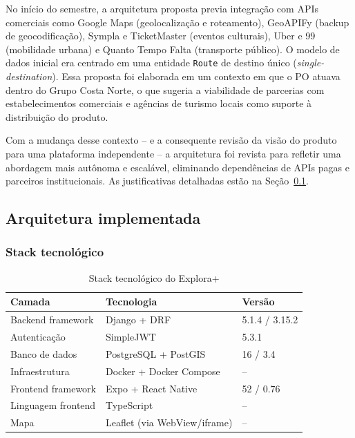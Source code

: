 \documentclass[12pt, a4paper]{article}
\begin{document}
No in\'icio do semestre, a arquitetura proposta previa integra\c{c}\~ao com APIs comerciais como Google Maps (geolocaliza\c{c}\~ao e roteamento), GeoAPIFy (backup de geocodifica\c{c}\~ao), Sympla e TicketMaster (eventos culturais), Uber e 99 (mobilidade urbana) e Quanto Tempo Falta (transporte p\'ublico). O modelo de dados inicial era centrado em uma entidade \texttt{Route} de destino \'unico (\emph{single-destination}). Essa proposta foi elaborada em um contexto em que o PO atuava dentro do Grupo Costa Norte, o que sugeria a viabilidade de parcerias com estabelecimentos comerciais e ag\^encias de turismo locais como suporte \`a distribui\c{c}\~ao do produto.

Com a mudan\c{c}a desse contexto -- e a consequente revis\~ao da vis\~ao do produto para uma plataforma independente -- a arquitetura foi revista para refletir uma abordagem mais aut\^onoma e escal\'avel, eliminando depend\^encias de APIs pagas e parceiros institucionais. As justificativas detalhadas est\~ao na Se\c{c}\~ao~\ref{sec:arch}.

\subsection{Arquitetura implementada}
\label{sec:arch}

\subsubsection{Stack tecnol\'ogico}

\begin{table}[H]
\centering
\caption{Stack tecnol\'ogico do Explora+}
\begin{tabular}{lll}
\toprule
\textbf{Camada} & \textbf{Tecnologia} & \textbf{Vers\~ao} \\
\midrule
Backend framework & Django + DRF & 5.1.4 / 3.15.2 \\
Autentica\c{c}\~ao & SimpleJWT & 5.3.1 \\
Banco de dados & PostgreSQL + PostGIS & 16 / 3.4 \\
Infraestrutura & Docker + Docker Compose & -- \\
Frontend framework & Expo + React Native & 52 / 0.76 \\
Linguagem frontend & TypeScript & -- \\
Mapa & Leaflet (via WebView/iframe) & -- \\
\bottomrule
\end{tabular}
\end{table}
\end{document}
